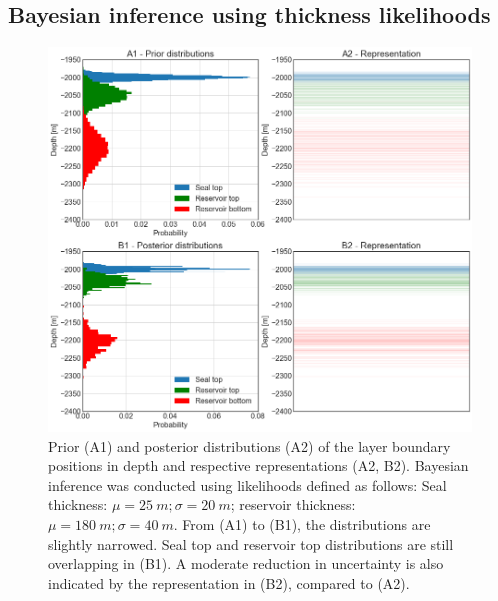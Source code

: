 			\subsection{Bayesian inference using thickness likelihoods}	
			\begin{figure}[p!]
				\centering
				\includegraphics[width=1\textwidth]{Figures/update_moderate1.png}
				\caption{Prior (A1) and posterior distributions (A2) of the layer boundary positions in depth and respective representations (A2, B2). Bayesian inference was conducted using likelihoods defined as follows: Seal thickness: $\mu = 25~m; \sigma = 20~m$; reservoir thickness: $\mu = 180~m; \sigma = 40~m$. From (A1) to (B1), the distributions are slightly narrowed. Seal top and reservoir top distributions are still overlapping in (B1). A moderate reduction in uncertainty is also indicated by the representation in (B2), compared to (A2).}\label{fig:update_moderate1} 
			\end{figure}
